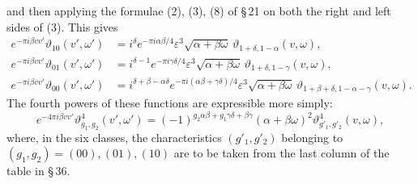 \documentclass[11pt]{article}
\providecommand{\tht}{\vartheta}
\begin{document}
and then applying the formulae (2), (3), (8) of \S\,21 on both the right and left sides of (3). This gives
\begin{align}
e^{-\pi i\beta vv'}\tht_{10}(v',\omega')
&=i^\delta e^{-\pi i\alpha\beta/4}\varepsilon^3\sqrt{\alpha+
\beta\omega}\,\tht_{1+
\delta,1-
\alpha}(v,
\omega), \tag{4}\\
e^{-\pi i\beta vv'}\tht_{01}(v',\omega')
&=i^{\delta-1}e^{-\pi i\gamma\delta/4}\varepsilon^3\sqrt{\alpha+
\beta\omega}\,\tht_{1+
\delta,1-
\gamma}(v,
\omega), \tag{5}\\
e^{-\pi i\beta vv'}\tht_{00}(v',\omega')
&=i^{\delta+
\beta-
\alpha\delta}e^{-\pi i(
\alpha\beta+
\gamma\delta)/4}\varepsilon^3\sqrt{\alpha+
\beta\omega}\,
\tht_{1+
\beta+
\delta,1-
\alpha-
\gamma}(v,
\omega). \tag{6}
\end{align}
The fourth powers of these functions are expressible more simply:
\begin{equation}
e^{-4\pi i\beta vv'}\tht_{g_1,g_2}^4(v',\omega')
=(-1)^{g_2\alpha\beta+g_1\gamma\delta+\beta\gamma}(
\alpha+
\beta\omega)^2\tht_{g'_1,g'_2}^4(v,
\omega),
\tag{7}
\end{equation}
where, in the six classes, the characteristics $(g'_1,g'_2)$ belonging to $(g_1,g_2)=(00),(01),(10)$ are to be taken from the last column of the table in \S\,36.
\end{document}
